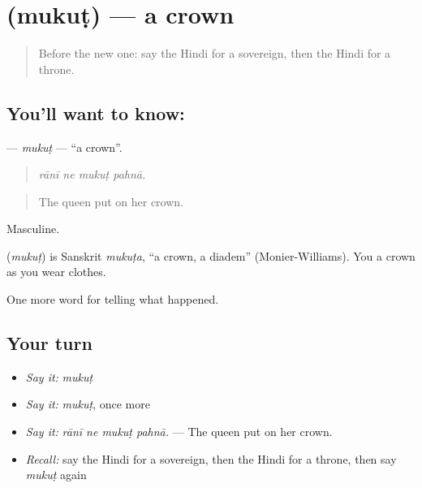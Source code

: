 \section[\texorpdfstring{\hi{मुकुट} (mukuṭ)}{मुकुट (mukuṭ)}]{ (mukuṭ) — a crown}

\label{lesson:HI-C320-mukut}



\begin{quote}
Before the new one: say the Hindi for a sovereign, then the Hindi for a throne.
\end{quote}

\subsection*{You'll want to know: }
\textbf{} — \emph{mukuṭ} — \textquotedblleft{}a crown\textquotedblright{}.

\begin{quote}
   
\end{quote}

\begin{quote}
\emph{rānī ne mukuṭ pahnā.}
\end{quote}

\begin{quote}
The queen put on her crown.
\end{quote}

Masculine.

\begin{cousinweb}
\textbf{} (\emph{mukuṭ}) is Sanskrit \emph{mukuṭa}, \textquotedblleft{}a crown, a diadem\textquotedblright{} (Monier-Williams). You \textbf{} a crown as you wear clothes.
\end{cousinweb}

\begin{grammarlens}[title={What you've built}]
One more word for telling what happened.
\end{grammarlens}

\subsection*{Your turn}
\begin{itemize}
\raggedright
  \item \emph{Say it:} \emph{mukuṭ}
  \item \emph{Say it:} \emph{mukuṭ}, once more
  \item \emph{Say it:} \emph{rānī ne mukuṭ pahnā.} — The queen put on her crown.
  \item \emph{Recall:} say the Hindi for a sovereign, then the Hindi for a throne, then say \emph{mukuṭ} again
\end{itemize}

